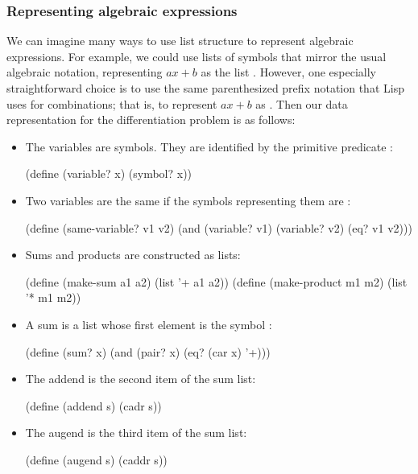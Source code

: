 \subsubsection*{Representing algebraic expressions}

We can imagine many ways to use list structure to represent algebraic expressions.
For example, we could use lists of symbols that mirror the usual algebraic notation, representing \( a x + b \) as the list .
However, one especially straightforward choice is to use the same parenthesized prefix notation that Lisp uses for combinations;
that is, to represent \( a x + b \) as .
Then our data representation for the differentiation problem is as follows:

\begin{itemize}

	\item
		The variables are symbols.
		They are identified by the primitive predicate :
		\begin{scheme}
		  (define (variable? x) (symbol? x))
		\end{scheme}

	\item
		Two variables are the same if the symbols representing them are :
		\begin{scheme}
		  (define (same-variable? v1 v2)
		    (and (variable? v1) (variable? v2) (eq? v1 v2)))
		\end{scheme}

	\item
		Sums and products are constructed as lists:
		\begin{scheme}
		  (define (make-sum a1 a2) (list '+ a1 a2))
		  (define (make-product m1 m2) (list '* m1 m2))
		\end{scheme}

	\item
		A sum is a list whose first element is the symbol \code{+}:
		\begin{scheme}
		  (define (sum? x) (and (pair? x) (eq? (car x) '+)))
		\end{scheme}

	\item
		The addend is the second item of the sum list:
		\begin{scheme}
		  (define (addend s) (cadr s))
		\end{scheme}

	\item
		The augend is the third item of the sum list:
		\begin{scheme}
		  (define (augend s) (caddr s))
		\end{scheme}


\end{itemize}

